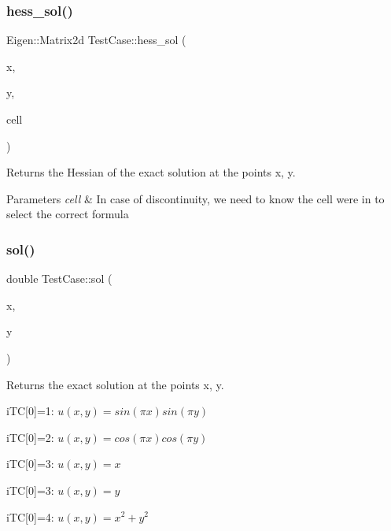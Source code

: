 \subsubsection{\texorpdfstring{hess\+\_\+sol()}{hess\_sol()}}
{\footnotesize\ttfamily Eigen\+::\+Matrix2d Test\+Case\+::hess\+\_\+sol (\begin{DoxyParamCaption}\item[{const double}]{x,  }\item[{const double}]{y,  }\item[{const \hyperlink{classHArDCore2D_1_1Cell}{Cell} $\ast$}]{cell }\end{DoxyParamCaption})}



Returns the Hessian of the exact solution at the points x, y. 


\begin{DoxyParams}{Parameters}
{\em cell} & In case of discontinuity, we need to know the cell we\textquotesingle{}re in to select the correct formula \\
\hline
\end{DoxyParams}
\mbox{\label{classTestCase_aede719dac81c460c713d930a379c537e}} 
\subsubsection{\texorpdfstring{sol()}{sol()}}
{\footnotesize\ttfamily double Test\+Case\+::sol (\begin{DoxyParamCaption}\item[{const double}]{x,  }\item[{const double}]{y }\end{DoxyParamCaption})}



Returns the exact solution at the points x, y. 

i\+TC\mbox{[}0\mbox{]}=1\+: $u(x,y)=sin(\pi x) sin(\pi y)$

i\+TC\mbox{[}0\mbox{]}=2\+: $u(x,y)=cos(\pi x) cos(\pi y)$

i\+TC\mbox{[}0\mbox{]}=3\+: $u(x,y)= x$

i\+TC\mbox{[}0\mbox{]}=3\+: $u(x,y)= y$

i\+TC\mbox{[}0\mbox{]}=4\+: $u(x,y)= x^2 + y^2$ \mbox{\label{classTestCase_a5b2e54e9f17ac2ec9c1d675f97fbe335}} 
